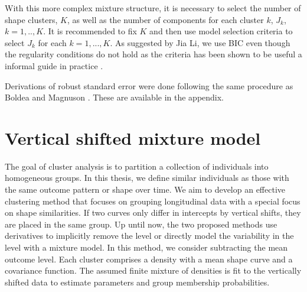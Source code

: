 With this more complex mixture structure, it is necessary to select the number of shape clusters, $K$, as well as the number of components for each cluster $k$, $J_{k}$, $k=1,..,K$. It is recommended to fix $K$ and then use model selection criteria to select $J_{k}$ for each $k=1,...,K$. As suggested by Jia Li, we use BIC even though the regularity conditions do not hold as the criteria has been shown to be useful a informal guide in practice \cite{li2005}.

Derivations of robust standard error  were done following the same procedure as Boldea and Magnuson \cite{boldea2009}. These are available in the appendix.

\section{Vertical shifted mixture model}
The goal of cluster analysis is to partition a collection of individuals into homogeneous groups. In this thesis, we define similar individuals as those with the same outcome pattern or shape over time. We aim to develop an effective clustering method that focuses on grouping longitudinal data with a special focus on shape similarities. If two curves only differ in intercepts by vertical shifts, they are placed in the same group. Up until now, the two proposed methods use derivatives to implicitly remove the level or directly model the variability in the level with a mixture model.  In this method, we consider subtracting the mean outcome level. Each cluster comprises a density with a mean shape curve and a covariance function. The assumed finite mixture of densities is fit to the vertically shifted data to estimate parameters and group membership probabilities. 

